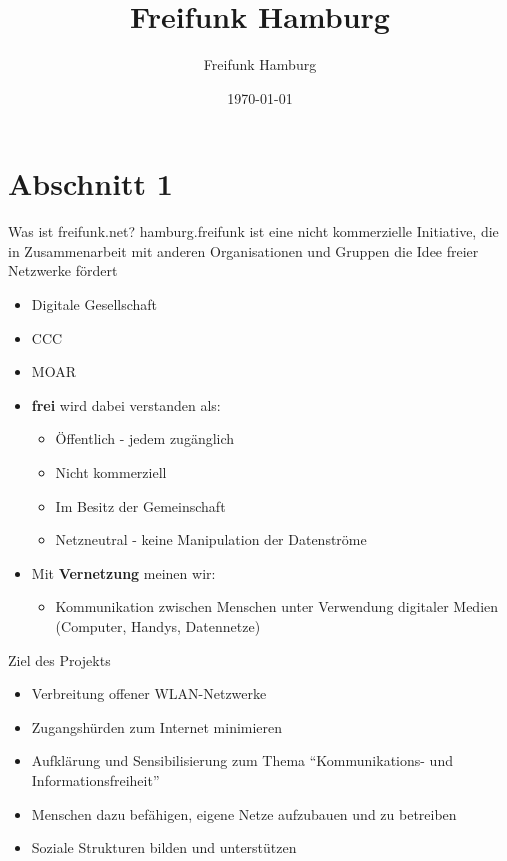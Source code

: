 \documentclass[aspectratio=43]{beamer}
\title{Freifunk Hamburg}
\author{Freifunk Hamburg}
\date{\today}
\begin{document}
\maketitle
\frame{\tableofcontents[currentsection]}

\section{Abschnitt 1}
\begin{frame}{Was ist freifunk.net?}
  hamburg.freifunk ist eine nicht kommerzielle Initiative, die in Zusammenarbeit mit anderen Organisationen und Gruppen die Idee freier Netzwerke fördert
  \begin{itemize}
	\item Digitale Gesellschaft
	\item CCC
	\item MOAR %
  \end{itemize}
\end{frame}

\begin{frame}
\begin{itemize}
	\item \textbf{frei} wird dabei verstanden als:
	\begin{itemize}
		\item Öffentlich - jedem zugänglich
		\item Nicht kommerziell
		\item Im Besitz der Gemeinschaft
		\item Netzneutral - keine Manipulation der Datenströme
	\end{itemize}
	\item Mit \textbf{Vernetzung} meinen wir:
	\begin{itemize}
		\item Kommunikation zwischen Menschen unter Verwendung digitaler Medien (Computer, Handys, Datennetze)
	\end{itemize}
  \end{itemize}
\end{frame}

\begin{frame}{Ziel des Projekts}
	\begin{itemize}
		\item Verbreitung offener WLAN-Netzwerke
		\item Zugangshürden zum Internet minimieren
		\item Aufklärung und Sensibilisierung zum Thema ``Kommunikations- und Informationsfreiheit''
		\item Menschen dazu befähigen, eigene Netze aufzubauen und zu betreiben
		\item Soziale Strukturen bilden und unterstützen %
	\end{itemize}
\end{frame}
\end{document}
